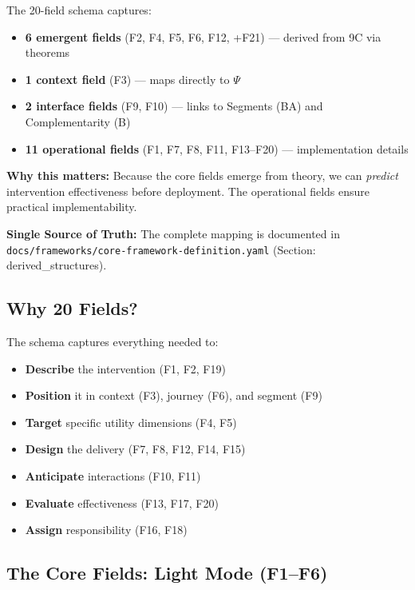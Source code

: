 \begin{tcolorbox}[colback=gray!5!white, colframe=gray!75!black,
    title=Implication for Practice]
The 20-field schema captures:
\begin{itemize}[nosep]
    \item \textbf{6 emergent fields} (F2, F4, F5, F6, F12, +F21) --- derived from 9C via theorems
    \item \textbf{1 context field} (F3) --- maps directly to $\Psi$
    \item \textbf{2 interface fields} (F9, F10) --- links to Segments (BA) and Complementarity (B)
    \item \textbf{11 operational fields} (F1, F7, F8, F11, F13--F20) --- implementation details
\end{itemize}

\textbf{Why this matters:} Because the core fields emerge from theory, we can \textit{predict} intervention effectiveness before deployment. The operational fields ensure practical implementability.

\textbf{Single Source of Truth:} The complete mapping is documented in \texttt{docs/frameworks/core-framework-definition.yaml} (Section: derived\_structures).
\end{tcolorbox}

\subsection{Why 20 Fields?}

The schema captures everything needed to:
\begin{itemize}
\item \textbf{Describe} the intervention (F1, F2, F19)
\item \textbf{Position} it in context (F3), journey (F6), and segment (F9)
\item \textbf{Target} specific utility dimensions (F4, F5)
\item \textbf{Design} the delivery (F7, F8, F12, F14, F15)
\item \textbf{Anticipate} interactions (F10, F11)
\item \textbf{Evaluate} effectiveness (F13, F17, F20)
\item \textbf{Assign} responsibility (F16, F18)
\end{itemize}

\subsection{The Core Fields: Light Mode (F1--F6)}

